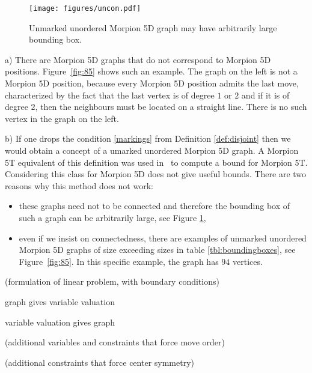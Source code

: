 \begin{figure}
  \centering
  \texttt{[image: figures/uncon.pdf]}
  \caption{
    Unmarked unordered Morpion 5D graph may have arbitrarily large bounding box.
  }
  \label{fig:uncon}
\end{figure}

\begin{remark}
a) There are Morpion 5D graphs that do not correspond to Morpion 5D positions. %
Figure~\ref{fig:85} shows such an example. The graph on the left is not a Morpion 5D position, 
because every Morpion 5D position admits the last move, characterized by the fact that the last vertex is of degree $1$ or $2$ and if it is
of degree $2$, then the neighbours must be located on a straight line. There is no such vertex in the graph on the left.
%

\noindent
b) If one drops the condition \ref{markings} from Definition \ref{def:disjoint} then we would obtain a concept of a umarked unordered Morpion 5D graph. A Morpion 5T equivalent
of this definition was used in~\cite{ijcai} to compute a bound for Morpion 5T.
Considering this class for Morpion 5D  does not give useful bounds. There are two reasons why this method does not work:
\begin{itemize}
\item these graphs need not to be connected and therefore the bounding box of such a graph
  can be arbitrarily large, see Figure \ref{fig:uncon}, 
\item even if we insist on connectedness, there are examples of unmarked unordered Morpion 5D graphs of size exceeding sizes in 
table \ref{tbl:boundingboxes}, see Figure~\ref{fig:85}. In this specific example, the graph has $94$ vertices.
\end{itemize}
\end{remark}

(formulation of linear problem, with boundary conditions)

\begin{lemma}
  graph gives variable valuation
\end{lemma}

\begin{lemma}
  variable valuation gives graph
\end{lemma}

(additional variables and constraints that force move order)

(additional constraints that force center symmetry)
